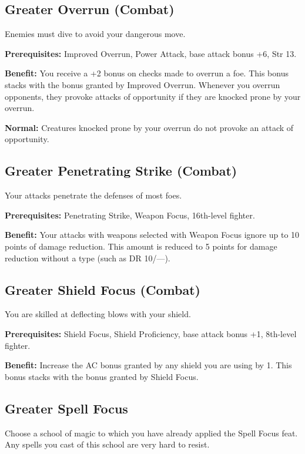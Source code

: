 \subsection{Greater Overrun (Combat)}

				
Enemies must dive to avoid your dangerous move.
				
\textbf{Prerequisites:} Improved Overrun, Power Attack, base attack bonus +6, Str 13.
				
\textbf{Benefit:} You receive a +2 bonus on checks made to overrun a foe. This bonus stacks with the bonus granted by Improved Overrun. Whenever you overrun opponents, they provoke attacks of opportunity if they are knocked prone by your overrun.
				
\textbf{Normal:} Creatures knocked prone by your overrun do not provoke an attack of opportunity.
				
\subsection{Greater Penetrating Strike (Combat)}

				
Your attacks penetrate the defenses of most foes. 
				
\textbf{Prerequisites:} Penetrating Strike, Weapon Focus, 16th-level fighter.
				
\textbf{Benefit:} Your attacks with weapons selected with Weapon Focus ignore up to 10 points of damage reduction. This amount is reduced to 5 points for damage reduction without a type (such as DR 10/---).
				
\subsection{Greater Shield Focus (Combat)}

				
You are skilled at deflecting blows with your shield.
				
\textbf{Prerequisites:} Shield Focus, Shield Proficiency, base attack bonus +1, 8th-level fighter.
				
\textbf{Benefit:} Increase the AC bonus granted by any shield you are using by 1. This bonus stacks with the bonus granted by Shield Focus.
				
\subsection{Greater Spell Focus}

				
Choose a school of magic to which you have already applied the Spell Focus feat. Any spells you cast of this school are very hard to resist. 
				
